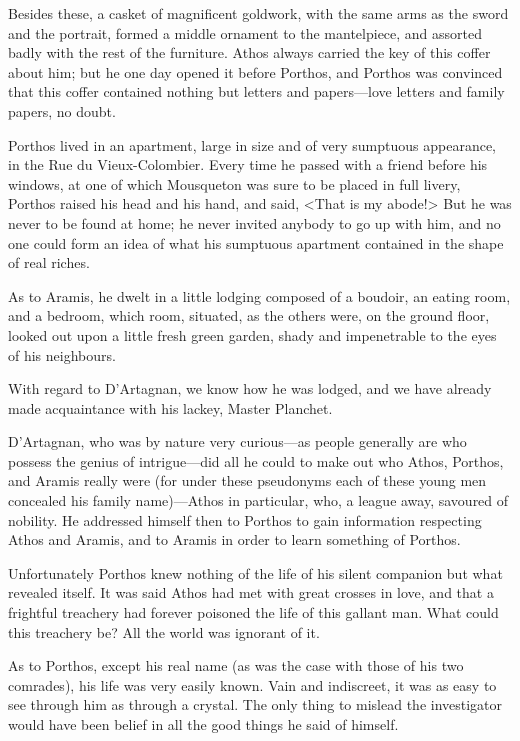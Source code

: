 Besides these, a casket of magnificent goldwork, with the same arms as the sword and the portrait, formed a middle ornament to the mantelpiece, and assorted badly with the rest of the furniture. Athos always carried the key of this coffer about him; but he one day opened it before Porthos, and Porthos was convinced that this coffer contained nothing but letters and papers—love letters and family papers, no doubt. 

Porthos lived in an apartment, large in size and of very sumptuous appearance, in the Rue du Vieux-Colombier. Every time he passed with a friend before his windows, at one of which Mousqueton was sure to be placed in full livery, Porthos raised his head and his hand, and said, <That is my abode!> But he was never to be found at home; he never invited anybody to go up with him, and no one could form an idea of what his sumptuous apartment contained in the shape of real riches. 

As to Aramis, he dwelt in a little lodging composed of a boudoir, an eating room, and a bedroom, which room, situated, as the others were, on the ground floor, looked out upon a little fresh green garden, shady and impenetrable to the eyes of his neighbours. 

With regard to D'Artagnan, we know how he was lodged, and we have already made acquaintance with his lackey, Master Planchet. 

D'Artagnan, who was by nature very curious—as people generally are who possess the genius of intrigue—did all he could to make out who Athos, Porthos, and Aramis really were (for under these pseudonyms each of these young men concealed his family name)—Athos in particular, who, a league away, savoured of nobility. He addressed himself then to Porthos to gain information respecting Athos and Aramis, and to Aramis in order to learn something of Porthos. 

Unfortunately Porthos knew nothing of the life of his silent companion but what revealed itself. It was said Athos had met with great crosses in love, and that a frightful treachery had forever poisoned the life of this gallant man. What could this treachery be? All the world was ignorant of it. 

As to Porthos, except his real name (as was the case with those of his two comrades), his life was very easily known. Vain and indiscreet, it was as easy to see through him as through a crystal. The only thing to mislead the investigator would have been belief in all the good things he said of himself. 

